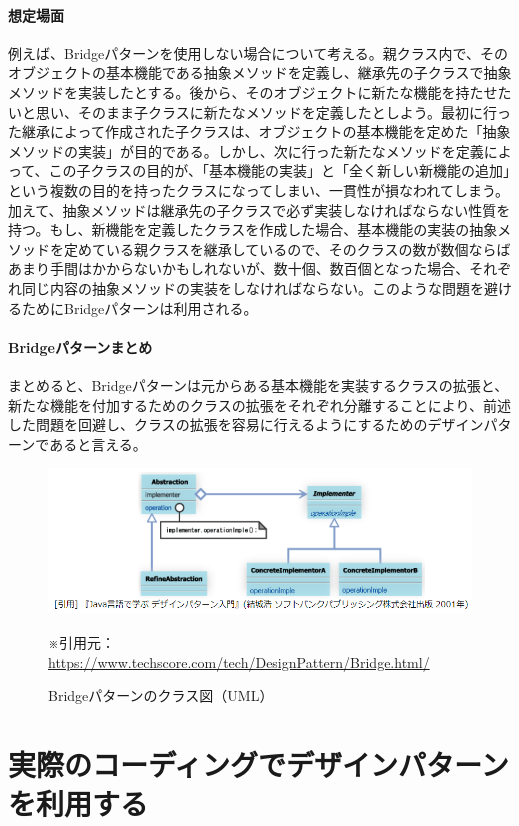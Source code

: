 \documentclass[dvipdfmx]{jsarticle}
\begin{document}
\paragraph{想定場面}
例えば、Bridgeパターンを使用しない場合について考える。親クラス内で、そのオブジェクトの基本機能である抽象メソッドを定義し、継承先の子クラスで抽象メソッドを実装したとする。後から、そのオブジェクトに新たな機能を持たせたいと思い、そのまま子クラスに新たなメソッドを定義したとしよう。最初に行った継承によって作成された子クラスは、オブジェクトの基本機能を定めた「抽象メソッドの実装」が目的である。しかし、次に行った新たなメソッドを定義によって、この子クラスの目的が、「基本機能の実装」と「全く新しい新機能の追加」という複数の目的を持ったクラスになってしまい、一貫性が損なわれてしまう。加えて、抽象メソッドは継承先の子クラスで必ず実装しなければならない性質を持つ。もし、新機能を定義したクラスを作成した場合、基本機能の実装の抽象メソッドを定めている親クラスを継承しているので、そのクラスの数が数個ならばあまり手間はかからないかもしれないが、数十個、数百個となった場合、それぞれ同じ内容の抽象メソッドの実装をしなければならない。このような問題を避けるためにBridgeパターンは利用される。\par

\paragraph{Bridgeパターンまとめ}
まとめると、Bridgeパターンは元からある基本機能を実装するクラスの拡張と、新たな機能を付加するためのクラスの拡張をそれぞれ分離することにより、前述した問題を回避し、クラスの拡張を容易に行えるようにするためのデザインパターンであると言える。
\begin{figure}[H]
  \centering
  \includegraphics[scale=0.6]{ImgMovies/bridge_ex.PNG}
  \caption{Bridgeパターンのクラス図（UML）}
  ※引用元：\url{https://www.techscore.com/tech/DesignPattern/Bridge.html/}
\end{figure}


\section{実際のコーディングでデザインパターンを利用する}
\end{document}
